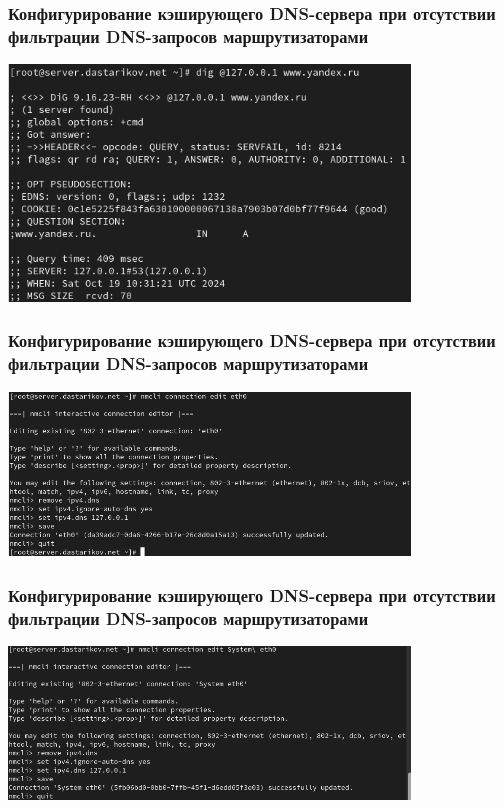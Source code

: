\begin{frame}
\frametitle{Конфигурирование кэширующего DNS-сервера при отсутствии фильтрации DNS-запросов маршрутизаторами}
    \centering
    \includegraphics[width=0.8\textwidth]{../images/image03.png}
\end{frame}


\begin{frame}
\frametitle{Конфигурирование кэширующего DNS-сервера при отсутствии фильтрации DNS-запросов маршрутизаторами}
    \centering
    \includegraphics[width=0.8\textwidth]{../images/image04.png}
\end{frame}


\begin{frame}
\frametitle{Конфигурирование кэширующего DNS-сервера при отсутствии фильтрации DNS-запросов маршрутизаторами}
    \centering
    \includegraphics[width=0.8\textwidth]{../images/image05.png}
\end{frame}


